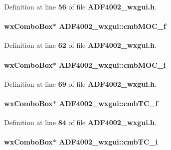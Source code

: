 Definition at line {\bf 56} of file {\bf A\+D\+F4002\+\_\+wxgui.\+h}.

\paragraph[{cmb\+M\+O\+C\+\_\+f}]{\setlength{\rightskip}{0pt plus 5cm}wx\+Combo\+Box$\ast$ A\+D\+F4002\+\_\+wxgui\+::cmb\+M\+O\+C\+\_\+f}\label{classADF4002__wxgui_a54ead9ce5028419c4715caddb7b72a05}


Definition at line {\bf 62} of file {\bf A\+D\+F4002\+\_\+wxgui.\+h}.

\paragraph[{cmb\+M\+O\+C\+\_\+i}]{\setlength{\rightskip}{0pt plus 5cm}wx\+Combo\+Box$\ast$ A\+D\+F4002\+\_\+wxgui\+::cmb\+M\+O\+C\+\_\+i}\label{classADF4002__wxgui_a46e6001d7222eb840cb3fcb2e231aa53}


Definition at line {\bf 69} of file {\bf A\+D\+F4002\+\_\+wxgui.\+h}.

\paragraph[{cmb\+T\+C\+\_\+f}]{\setlength{\rightskip}{0pt plus 5cm}wx\+Combo\+Box$\ast$ A\+D\+F4002\+\_\+wxgui\+::cmb\+T\+C\+\_\+f}\label{classADF4002__wxgui_a603e32a2f60a4fda4076f920452bc420}


Definition at line {\bf 84} of file {\bf A\+D\+F4002\+\_\+wxgui.\+h}.

\paragraph[{cmb\+T\+C\+\_\+i}]{\setlength{\rightskip}{0pt plus 5cm}wx\+Combo\+Box$\ast$ A\+D\+F4002\+\_\+wxgui\+::cmb\+T\+C\+\_\+i}\label{classADF4002__wxgui_a8714f3e2e10c19359db5d442a2b60c74}


